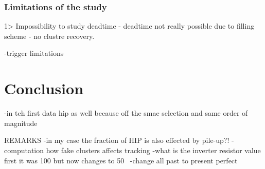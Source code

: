 \subsubsection{Limitations of the study}
 
1> Impossibility to study deadtime - deadtime not really possible due to filling scheme - no clustre recovery.

-trigger limitations

\section{Conclusion}
-in teh first data hip as well because off the smae selection and same order of magnitude



REMARKS
-in my case the fraction of HIP is also effected by pile-up?!
-computation how fake clusters affects tracking
-what is the inverter resistor value first it was 100 but now changes to 50~\cite{Gennai:2003as}
-change all past to present perfect
